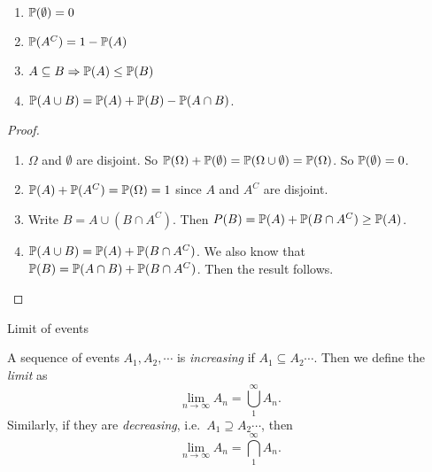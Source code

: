 %
\begin{note}
  \begin{field}
    \begin{thm}\leavevmode
      \begin{enumerate}
        \item $\P(\emptyset) = 0$
        \item $\P(A^C) = 1 - \P(A)$
        \item $A\subseteq B \Rightarrow \P(A) \leq \P(B)$
        \item $\P (A\cup B) = \P(A) + \P(B) - \P(A\cap B)$.
      \end{enumerate}
    \end{thm}
  \end{field}
  \begin{field}
    \begin{proof}\leavevmode
      \begin{enumerate}
        \item $\Omega$ and $\emptyset$ are disjoint. So $\P(\Omega) + \P(\emptyset) = \P(\Omega \cup \emptyset) = \P(\Omega)$. So $\P(\emptyset) = 0$.
        \item $\P(A) + \P(A^C) = \P(\Omega) = 1$ since $A$ and $A^C$ are disjoint.
        \item Write $B = A\cup (B\cap A^C)$. Then $\\P(B) = \P(A) + \P(B\cap A^C) \geq \P(A)$.
        \item $\P(A\cup B) = \P(A) + \P(B\cap A^C)$. We also know that $\P(B) = \P(A\cap B) + \P(B\cap A^C)$. Then the result follows.\qedhere
      \end{enumerate}
    \end{proof}
  \end{field}
  \xplain{}%
\end{note}

%
\begin{note}
  \begin{field}
    Limit of events
  \end{field}
  \begin{field}
    \begin{defi}
      A sequence of events $A_1, A_2, \cdots$ is \emph{increasing} if $A_1 \subseteq A_2 \cdots$. Then we define the \emph{limit} as
      \[
        \lim_{n\to \infty} A_n = \bigcup_{1}^\infty A_n.
      \]
      Similarly, if they are \emph{decreasing}, i.e.\ $A_1\supseteq A_2\cdots$, then
      \[
        \lim_{n\to \infty} A_n = \bigcap_{1}^\infty A_n.
      \]
    \end{defi}
  \end{field}
  \xplain{}%
\end{note}

